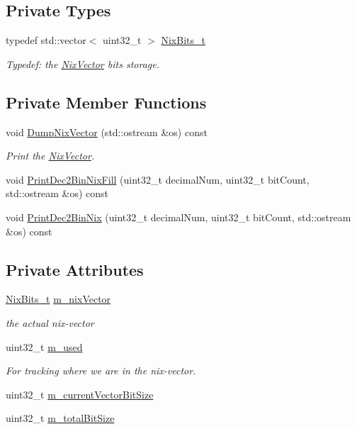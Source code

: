 \subsection*{Private Types}
\begin{DoxyCompactItemize}
\item 
typedef std\+::vector$<$ uint32\+\_\+t $>$ \hyperlink{classns3_1_1NixVector_a85f2af19f55707f2bca25549ef1c3539}{Nix\+Bits\+\_\+t}
\begin{DoxyCompactList}\small\item\em Typedef\+: the \hyperlink{classns3_1_1NixVector}{Nix\+Vector} bits storage. \end{DoxyCompactList}\end{DoxyCompactItemize}
\subsection*{Private Member Functions}
\begin{DoxyCompactItemize}
\item 
void \hyperlink{classns3_1_1NixVector_a9f43937ed30bf7c3ba96e2f38d7a460c}{Dump\+Nix\+Vector} (std\+::ostream \&os) const 
\begin{DoxyCompactList}\small\item\em Print the \hyperlink{classns3_1_1NixVector}{Nix\+Vector}. \end{DoxyCompactList}\item 
void \hyperlink{classns3_1_1NixVector_a9d5f9cbc3a06324f163078eb73932d3d}{Print\+Dec2\+Bin\+Nix\+Fill} (uint32\+\_\+t decimal\+Num, uint32\+\_\+t bit\+Count, std\+::ostream \&os) const 
\item 
void \hyperlink{classns3_1_1NixVector_a6cfc280674edc3350bb797a15b44c093}{Print\+Dec2\+Bin\+Nix} (uint32\+\_\+t decimal\+Num, uint32\+\_\+t bit\+Count, std\+::ostream \&os) const 
\end{DoxyCompactItemize}
\subsection*{Private Attributes}
\begin{DoxyCompactItemize}
\item 
\hyperlink{classns3_1_1NixVector_a85f2af19f55707f2bca25549ef1c3539}{Nix\+Bits\+\_\+t} \hyperlink{classns3_1_1NixVector_a8e3d193156da514255bb033ceb8500df}{m\+\_\+nix\+Vector}
\begin{DoxyCompactList}\small\item\em the actual nix-\/vector \end{DoxyCompactList}\item 
uint32\+\_\+t \hyperlink{classns3_1_1NixVector_a220076d3ab9a6ac07bfaee00360f1b18}{m\+\_\+used}
\begin{DoxyCompactList}\small\item\em For tracking where we are in the nix-\/vector. \end{DoxyCompactList}\item 
uint32\+\_\+t \hyperlink{classns3_1_1NixVector_ad2514d7b869b341fbe23f5cd54d92f58}{m\+\_\+current\+Vector\+Bit\+Size}
\item 
uint32\+\_\+t \hyperlink{classns3_1_1NixVector_a7a49e3aa07e9d0d45fd509dc5f95857a}{m\+\_\+total\+Bit\+Size}
\end{DoxyCompactItemize}
